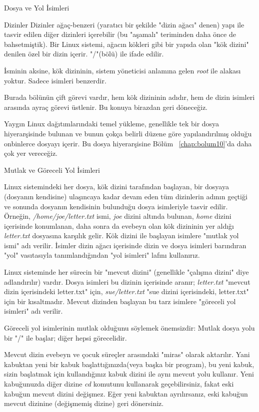 \begin{section}{Dosya ve Yol İsimleri}
\begin{subsection}{Dizinler}
Dizinler ağaç-benzeri (yaratıcı bir şekilde "dizin ağacı" denen) yapı ile tasvir edilen diğer dizinleri içerebilir (bu "aşamalı" teriminden daha önce de bahsetmiştik). Bir Linux sistemi, ağacın kökleri gibi bir yapıda olan "kök dizini" denilen özel bir dizin içerir. "/"(bölü) ile ifade edilir.
	
İsminin aksine, kök dizininin, sistem yöneticisi anlamına gelen \emph{root} ile alakası yoktur. Sadece isimleri benzerdir.
	
Burada bölünün çift görevi vardır, hem kök dizininin adıdır, hem de dizin isimleri arasında ayraç görevi üstlenir. Bu konuya birazdan geri döneceğiz.
	
Yaygın Linux dağıtımlarındaki temel yükleme, genellikle tek bir dosya hiyerarşisinde bulunan ve bunun çokça belirli düzene göre yapılandırılmış olduğu onbinlerce dosyayı içerir. Bu dosya hiyerarşisine Bölüm ~\ref{chap:bolum10}'da daha çok yer vereceğiz.
\end{subsection}
\begin{subsection}{Mutlak ve Göreceli Yol İsimleri}

Linux sistemindeki her dosya, kök dizini tarafından başlayan, bir dosyaya (dosyanın kendisine) ulaşıncaya kadar devam eden tüm dizinlerin adının geçtiği ve sonunda dosyanın kendisinin bulunduğu dosya isimleriyle tasvir edilir. Örneğin, \emph{/home/joe/letter.txt} ismi, \emph{joe} dizini altında bulunan, \emph{home} dizini içerisinde konumlanan, daha sonra da evebeyn olan kök dizininin yer aldığı \emph{letter.txt} dosyasına karşılık gelir. Kök dizini ile başlayan isimlere "mutlak yol ismi" adı verilir. İsimler dizin ağacı içerisinde dizin ve dosya isimleri barındıran "yol" vasıtasıyla tanımlandığından "yol isimleri" lafını kullanırız.

Linux sisteminde her sürecin bir "mevcut dizini" (genellikle "çalışma dizini" diye adlandırılır) vardır. Dosya isimleri bu dizinin içerisinde aranır; \emph{letter.txt} "mevcut dizin içerisindeki letter.txt" için, \emph{sue/letter.txt} "sue dizini içerisindeki, letter.txt" için bir kısaltmadır. Mevcut dizinden başlayan bu tarz isimlere "göreceli yol isimleri" adı verilir.
	
Göreceli yol isimlerinin mutlak olduğunu söylemek önemsizdir: Mutlak dosya yolu bir "/" ile başlar; diğer hepsi görecelidir.
	
Mevcut dizin evebeyn ve çocuk süreçler arasındaki "miras" olarak aktarılır. Yani kabuktan yeni bir kabuk başlattığınızda(veya başka bir program), bu yeni kabuk, sizin başlatmak için kullandığınız kabuk dizini ile aynı mevcut yolu kullanır. Yeni kabuğunuzda diğer dizine \emph{cd} komutunu kullanarak geçebilirsiniz, fakat eski kabuğun mevcut dizini değişmez. Eğer yeni kabuktan ayrılırsanız, eski kabuğun mevcut dizinine (değişmemiş dizine) geri dönersiniz. 
	

\end{subsection}
\end{section}
